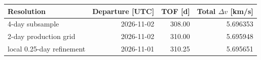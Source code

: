 \begin{tabular}{lrrr}
\toprule
Resolution & Departure [UTC] & TOF [d] & Total $\Delta v$ [km/s] \\
\midrule
4-day subsample & 2026-11-02 & 308.00 & 5.696353 \\
2-day production grid & 2026-11-02 & 310.00 & 5.695948 \\
local 0.25-day refinement & 2026-11-01 & 310.25 & 5.695651 \\
\bottomrule
\end{tabular}